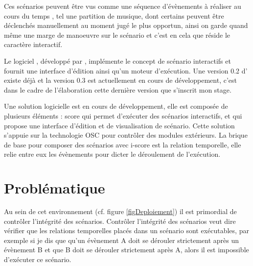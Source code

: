 
Ces scénarios peuvent être vus comme une séquence d'évènements à réaliser au cours du temps , tel une partition de musique, dont certains peuvent être déclenchés manuellement au moment jugé le plus opportun, ainsi on garde quand même une marge de manoeuvre sur le scénario et c'est en cela que réside le caractère interactif.


Le logiciel \iscore{}, développé par \ossia{}, implémente le concept de scénario interactifs et fournit une interface d'édition ainsi qu'un moteur d'exécution. Une version 0.2 d'\iscore{} existe déjà et la version 0.3 est actuellement en cours de développement, c'est dans le cadre de l'élaboration cette dernière version que s'inscrit mon stage. 



Une solution logicielle est en cours de développement, elle est composée de plusieurs éléments : score qui permet d'exécuter des scénarios interactifs, et \iscore{} qui propose une interface d'édition et de visualisation de scénario. Cette solution s'appuie sur la technologie OSC pour contrôler des modules extérieurs. La brique de base pour composer des scénarios avec i-score est la relation temporelle, elle relie entre eux les évènements pour dicter le déroulement de l'exécution.



\section*{Problématique}

Au sein de cet environnement (cf. figure \ref{figDeploiement}) il est primordial de contrôler l'intégrité des scénarios. Contrôler l'intégrité des scénarios veut dire vérifier que les relations temporelles placés dans un scénario sont exécutables, par exemple si je dis que qu'un évènement A doit se dérouler strictement après un évènement B et que B doit se dérouler strictement après A, alors il est impossible d'exécuter ce scénario.


